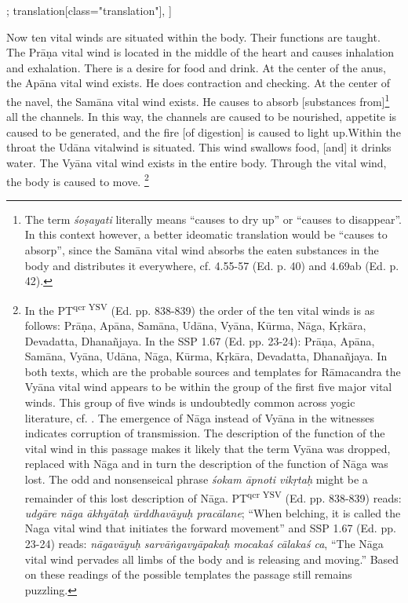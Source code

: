 \begin{alignment}[
  texts=edition[class="edition"];
  translation[class="translation"],
  ]
\begin{translation}
\begin{tlate}
Now ten vital winds are situated within the body. Their functions are taught. The Prāṇa vital wind is located in the middle of the heart and causes inhalation and exhalation. There is a desire for food and drink. At the center of the anus, the Apāna vital wind exists.\textsuperscript{\coro{[\lowroman{5}]}} He does contraction and checking. At the center of the navel, the Samāna vital wind exists. He causes to absorb [substances from]\footnote{The term \textit{śoṣayati} literally means ``causes to dry up'' or ``causes to disappear''. In this context however, a better ideomatic translation would be ``causes to absorp'', since the Samāna vital wind absorbs the eaten substances in the body and distributes it everywhere, cf.  4.55-57 (Ed. p. 40) and 4.69ab (Ed. p. 42).}  all the channels. In this way, the channels are caused to be nourished, appetite is caused to be generated, and the fire [of digestion] is caused to light up.\textsuperscript{\coro{[\lowroman{10}]}}Within the throat the Udāna vitalwind is situated. This wind swallows food, [and] it drinks water. The Vyāna vital wind exists in the entire body. Through the vital wind, the body is caused to move.\textsuperscript{\coro{[\lowroman{15}]}} \sic{\crazy{\ldots}}\footnote{In the PT\textsuperscript{qcr \cdot YSV} (Ed. pp. 838-839) the order of the ten vital winds is as follows: Prāṇa, Apāna, Samāna, Udāna, Vyāna, Kūrma, Nāga, Kṛkāra, Devadatta, Dhanañjaya. In the SSP 1.67 (Ed. pp. 23-24): Prāṇa, Apāna, Samāna, Vyāna, Udāna, Nāga, Kūrma, Kṛkāra, Devadatta, Dhanañjaya. In both texts, which are the probable sources and templates for Rāmacandra the Vyāna vital wind appears to be within the group of the first five major vital winds. This group of five winds is undoubtedly common across yogic literature, cf. \citeauthor[2017: 187-198]{rootsofyoga2017}. The emergence of Nāga instead of Vyāna in the witnesses indicates corruption of transmission. The description of the function of the vital wind in this passage makes it likely that the term Vyāna was dropped, replaced with Nāga and in turn the description of the function of Nāga was lost. The odd and nonsenseical phrase \textit{śokam āpnoti vikṛtaḥ} might be a remainder of this lost description of Nāga. PT\textsuperscript{qcr \cdot YSV} (Ed. pp. 838-839) reads: \textit{udgāre nāga ākhyātaḥ ūrddhavāyuḥ pracālane}; ``When belching, it is called the Naga vital wind that initiates the forward movement'' and SSP 1.67 (Ed. pp. 23-24) reads: \textit{nāgavāyuḥ sarvāṅgavyāpakaḥ mocakaś cālakaś ca}, ``The Nāga vital wind pervades all limbs of the body and is releasing and moving.'' Based on these readings of the possible templates the passage still remains puzzling.}
    \end{tlate}
  \end{translation}
\end{alignment}
